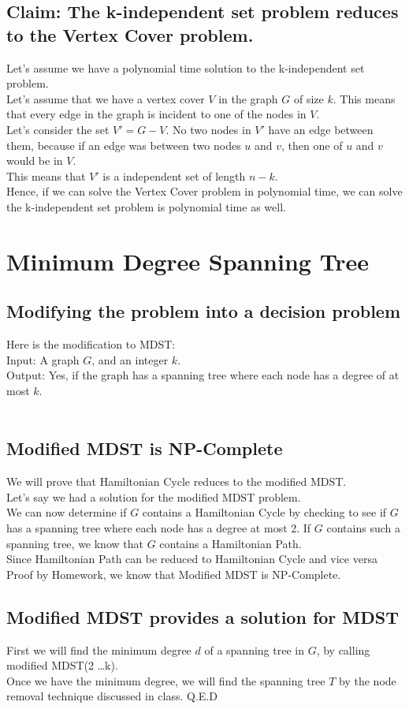 \documentclass[12pt,twocolumn]{article}
\begin{document}
\subsection{Claim: The k-independent set problem reduces to the Vertex Cover problem.}
Let's assume we have a polynomial time solution to the k-independent set problem.\\
Let's assume that we have a vertex cover $V$ in the graph $G$ of size $k$. This means that every edge in the graph is incident to one of the nodes in $V$. \\
Let's consider the set $V' = G - V$. No two nodes in $V'$ have an edge between them, because if an edge was between two nodes $u$ and $v$, then one of $u$ and $v$ would be in $V$.\\
This means that $V'$ is a independent set of length $n-k$.\\
Hence, if we can solve the Vertex Cover problem in polynomial time, we can solve the k-independent set problem is polynomial time as well.

\section{ Minimum Degree Spanning Tree }
\subsection{Modifying the problem into a decision problem}
Here is the modification to MDST:\\
Input: A graph $G$, and an integer $k$.\\
Output: Yes, if the graph has a spanning tree where each node has a degree of at most $k$.\\
\\
\subsection{Modified MDST is NP-Complete}
We will prove that Hamiltonian Cycle reduces to the modified MDST.\\
Let's say we had a solution for the modified MDST problem.\\
We can now determine if $G$ contains a Hamiltonian Cycle by checking to see if $G$ has a spanning tree where each node has a degree at most 2. If $G$ contains such a spanning tree, we know that $G$ contains a Hamiltonian Path.\\
Since Hamiltonian Path can be reduced to Hamiltonian Cycle and vice versa {Proof by Homework}, we know that Modified MDST is NP-Complete.
\subsection{Modified MDST provides a solution for MDST}
First we will find the minimum degree $d$ of a spanning tree in $G$, by calling modified MDST(2 \dots k).\\
Once we have the minimum degree, we will find the spanning tree $T$ by the node removal technique discussed in class.
Q.E.D
\end{document}
